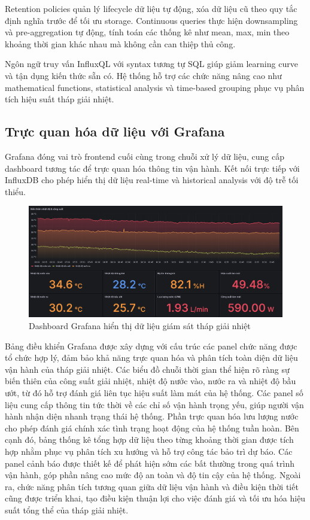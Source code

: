 \documentclass[../main.tex]{subfiles}
\begin{document}
Retention policies quản lý lifecycle dữ liệu tự động, xóa dữ liệu cũ theo quy tắc định nghĩa trước để tối ưu storage. Continuous queries thực hiện downsampling và pre-aggregation tự động, tính toán các thống kê như mean, max, min theo khoảng thời gian khác nhau mà không cần can thiệp thủ công.

Ngôn ngữ truy vấn InfluxQL với syntax tương tự SQL giúp giảm learning curve và tận dụng kiến thức sẵn có. Hệ thống hỗ trợ các chức năng nâng cao như mathematical functions, statistical analysis và time-based grouping phục vụ phân tích hiệu suất tháp giải nhiệt.

\subsection{Trực quan hóa dữ liệu với Grafana}
\label{sec:grafana_visualization}

Grafana đóng vai trò frontend cuối cùng trong chuỗi xử lý dữ liệu, cung cấp dashboard tương tác để trực quan hóa thông tin vận hành. Kết nối trực tiếp với InfluxDB cho phép hiển thị dữ liệu real-time và historical analysis với độ trễ tối thiểu.

\begin{figure}
    \centering
    \includegraphics[width=1\textwidth]{../Hinhve/grafana_cap.png}
    \caption{Dashboard Grafana hiển thị dữ liệu giám sát tháp giải nhiệt}
    \label{fig:grafana_dashboard}
\end{figure}

Bảng điều khiển Grafana được xây dựng với cấu trúc các panel chức năng được tổ chức hợp lý, đảm bảo khả năng trực quan hóa và phân tích toàn diện dữ liệu vận hành của tháp giải nhiệt. Các biểu đồ chuỗi thời gian thể hiện rõ ràng sự biến thiên của công suất giải nhiệt, nhiệt độ nước vào, nước ra và nhiệt độ bầu ướt, từ đó hỗ trợ đánh giá liên tục hiệu suất làm mát của hệ thống. Các panel số liệu cung cấp thông tin tức thời về các chỉ số vận hành trọng yếu, giúp người vận hành nhận diện nhanh trạng thái hệ thống. Phần trực quan hóa lưu lượng nước cho phép đánh giá chính xác tình trạng hoạt động của hệ thống tuần hoàn. Bên cạnh đó, bảng thống kê tổng hợp dữ liệu theo từng khoảng thời gian được tích hợp nhằm phục vụ phân tích xu hướng và hỗ trợ công tác bảo trì dự báo. Các panel cảnh báo được thiết kế để phát hiện sớm các bất thường trong quá trình vận hành, góp phần nâng cao mức độ an toàn và độ tin cậy của hệ thống. Ngoài ra, chức năng phân tích tương quan giữa dữ liệu vận hành và điều kiện thời tiết cũng được triển khai, tạo điều kiện thuận lợi cho việc đánh giá và tối ưu hóa hiệu suất tổng thể của tháp giải nhiệt.
\end{document}
